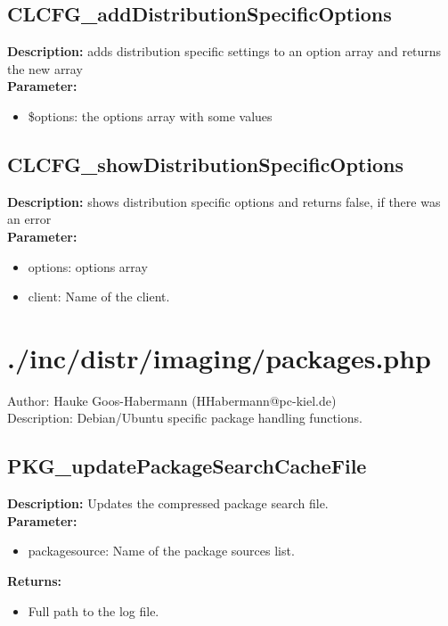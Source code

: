 \subsection{CLCFG\_addDistributionSpecificOptions}
\textbf{Description:} adds distribution specific settings to an option array and returns the new array\\
\textbf{Parameter:}
\begin{itemize}
\item \$options: the options array with some values
\end{itemize}

\subsection{CLCFG\_showDistributionSpecificOptions}
\textbf{Description:} shows distribution specific options and returns false, if there was an error\\
\textbf{Parameter:}
\begin{itemize}
\item options: options array
\item client: Name of the client.
\end{itemize}

\newpage\section{./inc/distr/imaging/packages.php}
 Author: Hauke Goos-Habermann (HHabermann@pc-kiel.de)\\
 Description: Debian/Ubuntu specific package handling functions.\\

\subsection{PKG\_updatePackageSearchCacheFile}
\textbf{Description:} Updates the compressed package search file.\\
\textbf{Parameter:}
\begin{itemize}
\item packagesource: Name of the package sources list.
\end{itemize}
\textbf{Returns:}
\begin{itemize}
\item Full path to the log file.
\end{itemize}

